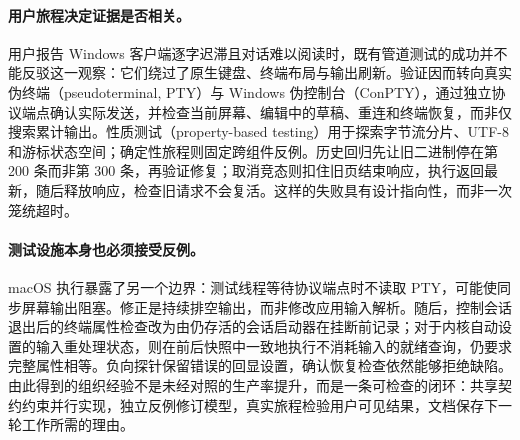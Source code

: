 \paragraph{用户旅程决定证据是否相关。}
用户报告 Windows 客户端逐字迟滞且对话难以阅读时，既有管道测试的成功并不能反驳这一观察：它们绕过了原生键盘、终端布局与输出刷新。验证因而转向真实伪终端（pseudoterminal, PTY）与 Windows 伪控制台（ConPTY），通过独立协议端点确认实际发送，并检查当前屏幕、编辑中的草稿、重连和终端恢复，而非仅搜索累计输出。性质测试（property-based testing）用于探索字节流分片、UTF-8 和游标状态空间\cite{quickcheck}；确定性旅程则固定跨组件反例。历史回归先让旧二进制停在第 200 条而非第 300 条，再验证修复；取消竞态则扣住旧页结束响应，执行返回最新，随后释放响应，检查旧请求不会复活。这样的失败具有设计指向性，而非一次笼统超时。

\paragraph{测试设施本身也必须接受反例。}
macOS 执行暴露了另一个边界：测试线程等待协议端点时不读取 PTY，可能使同步屏幕输出阻塞。修正是持续排空输出，而非修改应用输入解析。随后，控制会话退出后的终端属性检查改为由仍存活的会话启动器在挂断前记录；对于内核自动设置的输入重处理状态，则在前后快照中一致地执行不消耗输入的就绪查询，仍要求完整属性相等。负向探针保留错误的回显设置，确认恢复检查依然能够拒绝缺陷。由此得到的组织经验不是未经对照的生产率提升，而是一条可检查的闭环：共享契约约束并行实现，独立反例修订模型，真实旅程检验用户可见结果，文档保存下一轮工作所需的理由。
